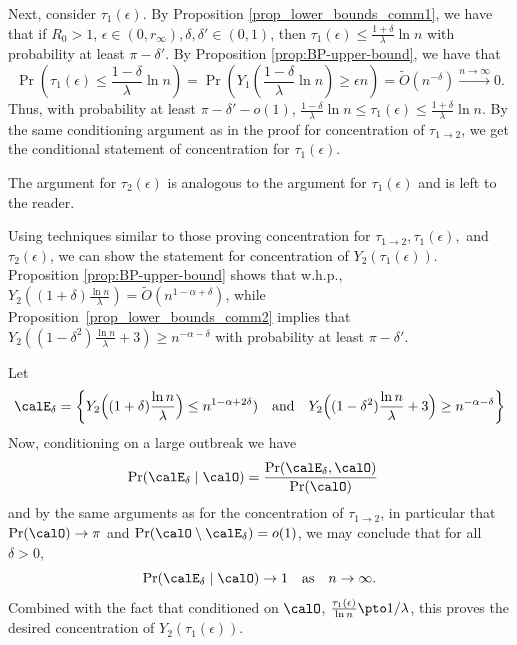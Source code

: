 \documentclass[11pt]{article}
\begin{document}
\begin{enumerate}[label=(\alph*)]
    Next, consider $\tau_1(\epsilon)$. By Proposition \ref{prop_lower_bounds_comm1}, we have that if $R_0 > 1$, $\epsilon \in (0, r_\infty), \delta,\delta' \in (0, 1)$, then $\tau_1(\epsilon) \leq \frac{1+\delta}{\lambda}\ln n$ with probability at least $\pi - \delta'$. By Proposition \ref{prop:BP-upper-bound}, we have that 
    \[
        \Pr\left(\tau_1(\epsilon) \leq \frac{1-\delta}{\lambda}\ln n\right) = \Pr\left(Y_1\left(\frac{1-\delta}{\lambda}\ln n\right) \geq \epsilon n\right) = \tilde O(n^{-\delta}) \xrightarrow{n\to\infty} 0.
    \]
    Thus, with probability at least $\pi-\delta'-o(1)$, $\frac{1-\delta}{\lambda}\ln n \leq \tau_1(\epsilon) \leq \frac{1+\delta}{\lambda}\ln n$. By the same conditioning argument as in the proof for concentration of $\tau_{1\to 2}$, we get the conditional statement of concentration for $\tau_1(\epsilon)$. 

    The argument for $\tau_2(\epsilon)$ is analogous to the argument for $\tau_1(\epsilon)$ and is left to the reader. 

    Using  techniques similar to those proving concentration
    for $\tau_{1\to 2}, \tau_1(\epsilon),$ and $\tau_2(\epsilon)$,
   we can show the statement for concentration of $Y_2(\tau_1(\epsilon))$. Proposition \ref{prop:BP-upper-bound} shows that w.h.p., $Y_2((1+\delta)\frac{\ln n}\lambda)=\tilde O(n^{1-\alpha+\delta})$,
    while Proposition~\ref{prop_lower_bounds_comm2} 
 implies that $Y_2((1-\delta^2)\frac {\ln n}\lambda +3)\geq n^{-\alpha-\delta}$ with probability at least $\pi-\delta'$.

 Let 
\[
    \calE_{\delta} = \left\{
        Y_2\Big((1+\delta)\frac{\ln n}\lambda\Big)\leq n^{1-\alpha+2\delta})
    \quad\text{and}\quad 
        Y_2\Big((1-\delta^2)\frac {\ln n}\lambda +3\Big)\geq n^{-\alpha-\delta}
   \right\}
    \]
    Now, conditioning on a large outbreak we have 
    \begin{align*}
        \Pr(\calE_{\delta} \mid \calO) &= \frac{\Pr(\calE_{\delta}, \calO)}{\Pr(\calO)}
    \end{align*}
    and by the same arguments as for the concentration of $\tau_{1\to 2}$, in particular that $\Pr(\calO) \to \pi$ and $\Pr( \calO\setminus \calE_{\delta}) = o(1)$, we may conclude that for all $\delta>0$,
    $$
    \Pr(\calE_{\delta} \mid \calO) \to 1\quad\text{as}\quad n\to\infty.
    $$
    Combined with the fact that conditioned on $\calO$,  $\frac{\tau_1(\epsilon)}{\ln n}\pto 1/\lambda$, this proves the desired concentration of $Y_2(\tau_1(\epsilon))$.


\end{enumerate}
\end{document}

